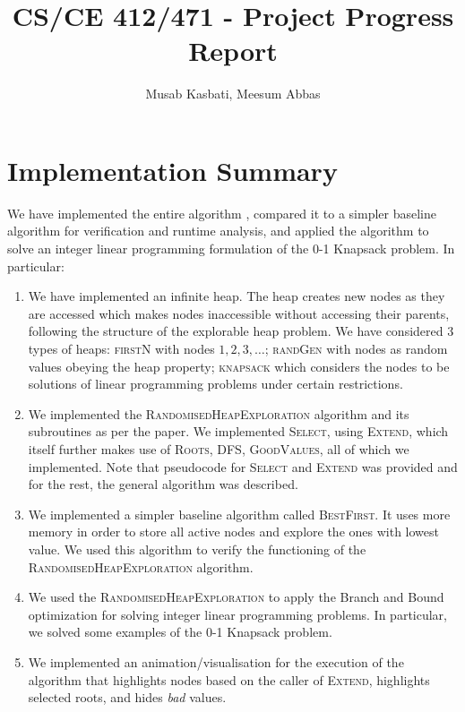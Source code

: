 \documentclass{article}
\title{CS/CE 412/471 - Project Progress Report}
\author{Musab Kasbati, Meesum Abbas}
\date{}
\begin{document}
\maketitle

\section{Implementation Summary}
We have implemented the entire algorithm \cite{Borst2025}, compared it to a simpler baseline algorithm for verification and runtime analysis, and applied the algorithm to solve an integer linear programming formulation of the 0-1 Knapsack problem. In particular:
\begin{enumerate}
    \item We have implemented an infinite heap. The heap creates new nodes as they are accessed which makes nodes inaccessible without accessing their parents, following the structure of the explorable heap problem. We have considered 3 types of heaps: \textsc{firstN} with nodes $1, 2, 3, \ldots$; \textsc{randGen} with nodes as random values obeying the heap property; \textsc{knapsack} which considers the nodes to be solutions of linear programming problems under certain restrictions.
    \item We implemented the \textsc{RandomisedHeapExploration} algorithm and its subroutines as per the paper. We implemented \textsc{Select}, using \textsc{Extend}, which itself further makes use of \textsc{Roots}, \textsc{DFS}, \textsc{GoodValues}, all of which we implemented. Note that pseudocode for \textsc{Select} and \textsc{Extend} was provided and for the rest, the general algorithm was described.
    \item We implemented a simpler baseline algorithm called \textsc{BestFirst}. It uses more memory in order to store all active nodes and explore the ones with lowest value. We used this algorithm to verify the functioning of the \textsc{RandomisedHeapExploration} algorithm.
    \item We used the \textsc{RandomisedHeapExploration} to apply the Branch and Bound optimization for solving integer linear programming problems. In particular, we solved some examples of the 0-1 Knapsack problem.
    \item We implemented an animation/visualisation for the execution of the algorithm that highlights nodes based on the caller of \textsc{Extend}, highlights selected roots, and hides \textit{bad} values.
\end{enumerate}
\end{document}
